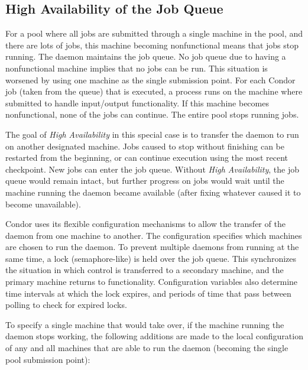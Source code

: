 \subsection{\label{sec:HA-schedd} High Availability of the Job Queue} 


For a pool where all jobs are submitted through
a single machine in the pool,
and there are lots of jobs,
this machine becoming nonfunctional means that
jobs stop running.
The  daemon maintains the job queue.
No job queue due to having a nonfunctional machine
implies that no jobs can be run.
This situation is worsened by using one machine
as the single submission point.
For each Condor job (taken from the queue) that is executed,
a  process runs on the machine where submitted
to handle input/output functionality.
If this machine becomes nonfunctional, none of the jobs can
continue.
The entire pool stops running jobs.

The goal of \emph{High Availability} in this special case is
to transfer the  daemon to run on another
designated machine.
Jobs caused to stop without finishing can be restarted from the
beginning, or can continue execution using the most recent checkpoint.
New jobs can enter the job queue.
Without \emph{High Availability},
the job queue would remain intact, but further progress on jobs
would wait until the machine running the  daemon
became available (after fixing whatever caused it to become
unavailable).

Condor uses its flexible configuration mechanisms to allow
the transfer of the  daemon from one machine
to another.
The configuration specifies
which machines are chosen to run the  daemon.
To prevent multiple  daemons from running at the same time,
a lock (semaphore-like) is held over the job queue.
This synchronizes  the situation in which control is
transferred to a secondary machine,
and the primary machine returns to functionality.
Configuration variables also determine time intervals at which 
the lock expires,
and periods of time that pass between polling to check
for expired locks.

To specify a single machine that would take over, if the
machine running the  daemon stops working,
the following additions are made to the local configuration
of any and all machines that are able to run the  daemon
(becoming the single pool submission point): 

